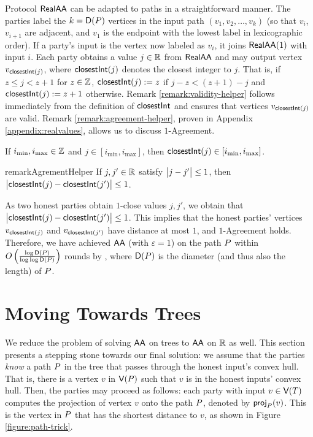 Protocol $\textsf{RealAA}$ can be adapted to paths in a straightforward manner. The parties label the $k = \textsf{D}(P)$ vertices in the input path $(v_1, v_2, \ldots, v_k)$ (so that $v_i$, $v_{i + 1}$ are adjacent, and $v_1$ is the endpoint with the lowest label in lexicographic order). If a party's input is the vertex now labeled as $v_i$, it joins $\textsf{RealAA}(1)$ with input $i$. Each party obtains a value $j \in \mathbb{R}$ from $\textsf{RealAA}$ and may output vertex $v_{\textsf{closestInt}(j)}$, where $\textsf{closestInt}(j)$ denotes the closest integer to $j$. That is, if $z \leq j < z + 1$ for $z \in \mathbb{Z}$, $\textsf{closestInt}(j) := z$ if $j - z < (z + 1) - j$ and $\textsf{closestInt}(j) := z + 1$ otherwise. Remark \ref{remark:validity-helper} follows immediately from the definition of $\textsf{closestInt}$ and ensures that vertices $v_{\textsf{closestInt}(j)}$ are valid. 
Remark \ref{remark:agreement-helper}, proven in Appendix \ref{appendix:realvalues}, allows us to discuss $1$-Agreement.
\begin{remark} \label{remark:validity-helper} 
If $i_{\min}, i_{\max} \in \mathbb{Z}$ and $j \in [i_{\min}, i_{\max}]$, then $\textsf{closestInt}(j) \in [i_{\min}, i_{\max}]$.
\end{remark}

\begin{restatable}{remark}{AgrementHelper}\label{remark:agreement-helper}
    If $j, j' \in \mathbb{R}$ satisfy $\big\lvert j - j'\big\rvert \leq 1$, then $\big\lvert\textsf{closestInt}(j) - \textsf{closestInt}(j')\big\rvert \leq 1$. 
\end{restatable}

As two honest parties obtain $1$-close values $j, j'$,  we obtain that $\big\lvert\textsf{closestInt}(j) - \textsf{closestInt}(j')\big\rvert \leq 1$. This implies that the honest parties' vertices $v_{\textsf{closestInt}(j)}$ and $v_{\textsf{closestInt}(j')}$  have distance at most $1$, and $1$-Agreement holds. Therefore, we have achieved $\textsf{AA}$ (with $\varepsilon = 1$) on the path $P$ within  $O\left( \frac{\log \textsf{D}(P)}{\log \log \textsf{D}(P)} \right)$ rounds by , where $\textsf{D}(P)$ is the diameter (and thus also the length) of $P$.


\section{Moving Towards Trees} \label{section:path-assumed}
We reduce the problem of solving $\textsf{AA}$ on trees to $\textsf{AA}$ on $\mathbb{R}$ as well. This section presents a stepping stone towards our final solution: we assume that the parties \emph{know} a path $P$ in the tree that passes through the honest input's convex hull. That is, there is a vertex $v$ in $\textsf{V}(P)$ such that $v$ is in the honest inputs' convex hull. 
Then, the parties may proceed as follows: each party with input $v \in \textsf{V}(T)$ computes the projection of vertex $v$ onto the path $P$, denoted by $\textsf{proj}_{P}(v)$. This is the vertex in $P$ that has the shortest distance to $v$, as shown in Figure \ref{figure:path-trick}.

